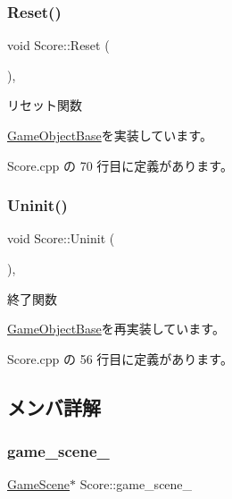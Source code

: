 \subsubsection{\texorpdfstring{Reset()}{Reset()}}
{\footnotesize\ttfamily void Score\+::\+Reset (\begin{DoxyParamCaption}{ }\end{DoxyParamCaption})\hspace{0.3cm}{\ttfamily [override]}, {\ttfamily [virtual]}}



リセット関数 



\mbox{\hyperlink{class_game_object_base_a85c59554f734bcb09f1a1e18d9517dce}{Game\+Object\+Base}}を実装しています。



 Score.\+cpp の 70 行目に定義があります。

\mbox{\label{class_score_a605e163dc59ccc4d19a3cb6b5db813b8}} 
\subsubsection{\texorpdfstring{Uninit()}{Uninit()}}
{\footnotesize\ttfamily void Score\+::\+Uninit (\begin{DoxyParamCaption}{ }\end{DoxyParamCaption})\hspace{0.3cm}{\ttfamily [override]}, {\ttfamily [virtual]}}



終了関数 



\mbox{\hyperlink{class_game_object_base_a97e1bc277d7b1c0156d4735de29a022c}{Game\+Object\+Base}}を再実装しています。



 Score.\+cpp の 56 行目に定義があります。



\subsection{メンバ詳解}
\mbox{\label{class_score_ada5a957b01fbed0c1bb52cea4e1bcbc4}} 
\subsubsection{\texorpdfstring{game\+\_\+scene\+\_\+}{game\_scene\_}}
{\footnotesize\ttfamily \mbox{\hyperlink{class_game_scene}{Game\+Scene}}$\ast$ Score\+::game\+\_\+scene\+\_\+}



